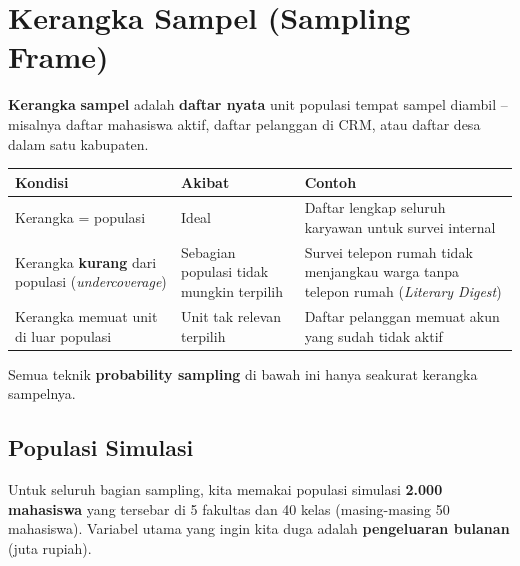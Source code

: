 \documentclass[
  indonesian,
  letterpaper,
]{book}
\newcounter{none} %
\begin{document}
\section{Kerangka Sampel (Sampling
Frame)}\label{kerangka-sampel-sampling-frame}

\textbf{Kerangka} \textbf{sampel} adalah \textbf{daftar nyata} unit
populasi tempat sampel diambil -- misalnya daftar mahasiswa aktif,
daftar pelanggan di CRM, atau daftar desa dalam satu kabupaten.

{\def\LTcaptype{none} %
\begin{longtable}[]{@{}
  >{\raggedright\arraybackslash}p{}
  >{\raggedright\arraybackslash}p{}
  >{\raggedright\arraybackslash}p{}@{}}
\toprule\noalign{}
\begin{minipage}[b]{\linewidth}\raggedright
Kondisi
\end{minipage} & \begin{minipage}[b]{\linewidth}\raggedright
Akibat
\end{minipage} & \begin{minipage}[b]{\linewidth}\raggedright
Contoh
\end{minipage} \\
\midrule\noalign{}
\endhead
\bottomrule\noalign{}
\endlastfoot
Kerangka = populasi & Ideal & Daftar lengkap seluruh karyawan untuk
survei internal \\
Kerangka \textbf{kurang} dari populasi (\emph{undercoverage}) & Sebagian
populasi tidak mungkin terpilih & Survei telepon rumah tidak menjangkau
warga tanpa telepon rumah (\emph{Literary Digest}) \\
Kerangka memuat unit di luar populasi & Unit tak relevan terpilih &
Daftar pelanggan memuat akun yang sudah tidak aktif \\
\end{longtable}
}

Semua teknik \textbf{probability sampling} di bawah ini hanya seakurat
kerangka sampelnya.

\subsection{Populasi Simulasi}\label{populasi-simulasi}

Untuk seluruh bagian sampling, kita memakai populasi simulasi
\textbf{2.000 mahasiswa} yang tersebar di 5 fakultas dan 40 kelas
(masing-masing 50 mahasiswa). Variabel utama yang ingin kita duga adalah
\textbf{pengeluaran bulanan} (juta rupiah).
\end{document}
